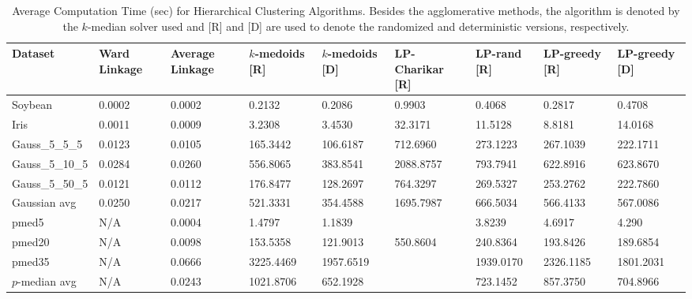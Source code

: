 \documentclass[conference, 10pt, final]{IEEEtran}
\begin{document}
\begin{table}[!t]
\caption{Average Computation Time (sec) for Hierarchical Clustering Algorithms. Besides the agglomerative methods, the algorithm is denoted by the $k$-median solver used and [R] and [D] are used to denote the randomized and deterministic versions, respectively.}
\centering
\begin{tabular}{ | l | l | l | l | l | l | l | l| l| }
\hline
Dataset	&	Ward Linkage	&	Average Linkage	&	$k$-medoids [R]	&	$k$-medoids [D]	&	LP-Charikar [R]	&	LP-rand [R]	&	LP-greedy [R]	&	LP-greedy [D]	\\ \hline
Soybean	&	0.0002	&	0.0002	&	0.2132	&	0.2086	&	0.9903	&	0.4068	&	0.2817	&	0.4708	\\
Iris	&	0.0011	&	0.0009	&	3.2308	&	3.4530	&	32.3171	&	11.5128	&	8.8181	&	14.0168	\\
Gauss\_5\_5\_5	&	0.0123	&	0.0105	&	165.3442	&	106.6187	&	712.6960	&	273.1223	&	267.1039	&	222.1711	\\
Gauss\_5\_10\_5	&	0.0284	&	0.0260	&	556.8065	&	383.8541	&	2088.8757	&	793.7941	&	622.8916	&	623.8670	\\
Gauss\_5\_50\_5	&	0.0121	&	0.0112	&	176.8477	&	128.2697	&	764.3297	&	269.5327	&	253.2762	&	222.7860	\\
Gaussian avg	&	0.0250	&	0.0217	&	521.3331	&	354.4588	&	1695.7987	&	666.5034	&	566.4133	&	567.0086	\\
pmed5	&	N/A	&	0.0004	&	1.4797	&	1.1839	&		&	3.8239	&	4.6917	&		4.290 \\
pmed20	&	N/A	&	0.0098	&	153.5358	&	121.9013	&	550.8604	&	240.8364	&	193.8426	&	189.6854	\\
pmed35	&	N/A	&	0.0666	&	3225.4469	&	1957.6519	&		&	1939.0170	&	2326.1185	&	1801.2031	\\
$p$-median avg	&	N/A	&	0.0243	&	1021.8706	&	652.1928	&		&	723.1452	&	857.3750	&	704.8966	\\ \hline
\end{tabular}
\label{fig:hier_results_comp}
\end{table}
\end{document}
